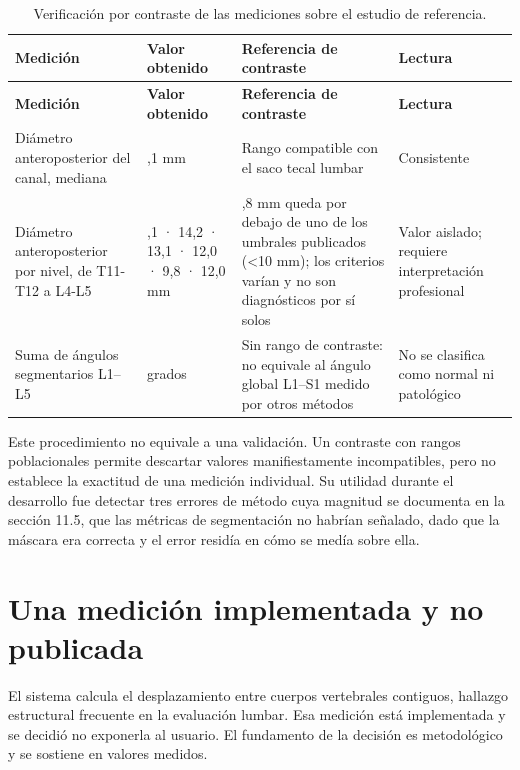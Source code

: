 {\scriptsize
\setlength{\LTleft}{0pt}
\setlength{\LTright}{0pt}
\setlength{\tabcolsep}{3pt}
\renewcommand{\arraystretch}{1.18}
\begin{longtable}{>{\raggedright\arraybackslash}p{} >{\raggedright\arraybackslash}p{} >{\raggedright\arraybackslash}p{} >{\raggedright\arraybackslash}p{}}
\caption{Verificación por contraste de las mediciones sobre el estudio de referencia.}\label{tab:res-contraste-mediciones}\\
\hline
\textbf{Medición} & \textbf{Valor obtenido} & \textbf{Referencia de contraste} & \textbf{Lectura} \\
\hline
\endfirsthead
\hline
\textbf{Medición} & \textbf{Valor obtenido} & \textbf{Referencia de contraste} & \textbf{Lectura} \\
\hline
\endhead
\hline
\endfoot
Diámetro anteroposterior del canal, mediana & 13,1 mm & Rango compatible con el saco tecal lumbar & Consistente \\
Diámetro anteroposterior por nivel, de T11-T12 a L4-L5 & 13,1 · 14,2 · 13,1 · 12,0 · 9,8 · 12,0 mm & 9,8 mm queda por debajo de uno de los umbrales publicados (<10 mm); los criterios varían y no son diagnósticos por sí solos \parencite{steurer_lumbar_stenosis_2011} & Valor aislado; requiere interpretación profesional \\
Suma de ángulos segmentarios L1–L5 & 36 grados & Sin rango de contraste: no equivale al ángulo global L1–S1 medido por otros métodos & No se clasifica como normal ni patológico \\
\hline
\end{longtable}
}

Este procedimiento no equivale a una validación. Un contraste con rangos poblacionales permite descartar valores manifiestamente incompatibles, pero no establece la exactitud de una medición individual. Su utilidad durante el desarrollo fue detectar tres errores de método cuya magnitud se documenta en la sección 11.5, que las métricas de segmentación no habrían señalado, dado que la máscara era correcta y el error residía en cómo se medía sobre ella.

\section{Una medición implementada y no publicada}

El sistema calcula el desplazamiento entre cuerpos vertebrales contiguos, hallazgo estructural frecuente en la evaluación lumbar. Esa medición está implementada y se decidió no exponerla al usuario. El fundamento de la decisión es metodológico y se sostiene en valores medidos.

